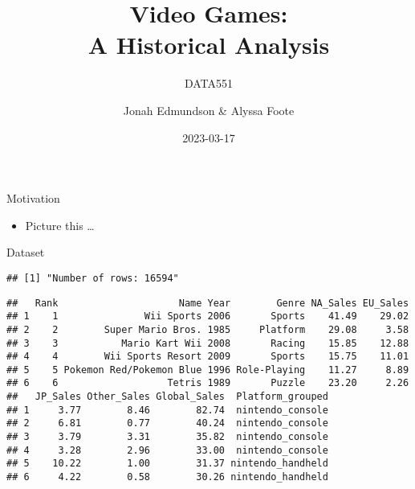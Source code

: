 \documentclass[
  11pt,
  ignorenonframetext,
]{beamer}
\title{Video Games:\\
A Historical Analysis}
\subtitle{DATA551}
\author{Jonah Edmundson \& Alyssa Foote}
\date{2023-03-17}
\providecommand{\tightlist}{%
  \setlength{\itemsep}{0pt}\setlength{\parskip}{0pt}}
\begin{document}
\frame{\titlepage}

\begin{frame}{Motivation}
\protect\hypertarget{motivation}{}
\begin{itemize}
\tightlist
\item
  Picture this \ldots{}
\end{itemize}
\end{frame}

\begin{frame}[fragile]{Dataset}
\protect\hypertarget{dataset}{}
\footnotesize

\begin{verbatim}
## [1] "Number of rows: 16594"
\end{verbatim}

\begin{verbatim}
##   Rank                     Name Year        Genre NA_Sales EU_Sales
## 1    1               Wii Sports 2006       Sports    41.49    29.02
## 2    2        Super Mario Bros. 1985     Platform    29.08     3.58
## 3    3           Mario Kart Wii 2008       Racing    15.85    12.88
## 4    4        Wii Sports Resort 2009       Sports    15.75    11.01
## 5    5 Pokemon Red/Pokemon Blue 1996 Role-Playing    11.27     8.89
## 6    6                   Tetris 1989       Puzzle    23.20     2.26
##   JP_Sales Other_Sales Global_Sales  Platform_grouped
## 1     3.77        8.46        82.74  nintendo_console
## 2     6.81        0.77        40.24  nintendo_console
## 3     3.79        3.31        35.82  nintendo_console
## 4     3.28        2.96        33.00  nintendo_console
## 5    10.22        1.00        31.37 nintendo_handheld
## 6     4.22        0.58        30.26 nintendo_handheld
\end{verbatim}
\end{frame}
\end{document}
